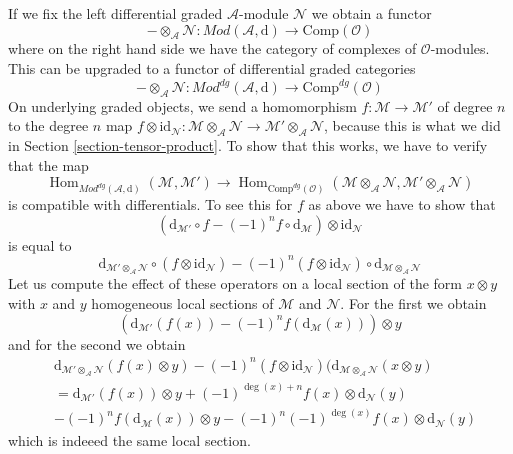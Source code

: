 \documentclass{stacks-project}
\theoremstyle{plain}
\theoremstyle{definition}
\theoremstyle{remark}
\numberwithin{equation}{subsection}
\def\Hom{\mathop{\mathrm{Hom}}\nolimits}
\begin{document}
\medskip\noindent
If we fix the left differential graded $\mathcal{A}$-module $\mathcal{N}$
we obtain a functor
$$
- \otimes_\mathcal{A} \mathcal{N} :
\textit{Mod}(\mathcal{A}, \text{d})
\longrightarrow
\text{Comp}(\mathcal{O})
$$
where on the right hand side we have the category of complexes of
$\mathcal{O}$-modules. This can be upgraded to a functor of
differential graded categories
$$
- \otimes_\mathcal{A} \mathcal{N} :
\textit{Mod}^{dg}(\mathcal{A}, \text{d})
\longrightarrow
\text{Comp}^{dg}(\mathcal{O})
$$
On underlying graded objects, we send
a homomorphism $f : \mathcal{M} \to \mathcal{M}'$ of degree $n$ 
to the degree $n$ map
$f \otimes \text{id}_\mathcal{N} :
\mathcal{M} \otimes_\mathcal{A} \mathcal{N} \to
\mathcal{M}' \otimes_\mathcal{A} \mathcal{N}$, because
this is what we did in Section \ref{section-tensor-product}.
To show that this works, we have to verify that the map
$$
\Hom_{\textit{Mod}^{dg}(\mathcal{A}, \text{d})}(\mathcal{M}, \mathcal{M}')
\longrightarrow
\Hom_{\text{Comp}^{dg}(\mathcal{O})}(
\mathcal{M} \otimes_\mathcal{A} \mathcal{N},
\mathcal{M}' \otimes_\mathcal{A} \mathcal{N})
$$
is compatible with differentials. To see this for $f$ as above
we have to show that
$$
(\text{d}_{\mathcal{M}'} \circ f - (-1)^n f \circ \text{d}_\mathcal{M})
\otimes \text{id}_\mathcal{N}
$$
is equal to
$$
\text{d}_{\mathcal{M}' \otimes_\mathcal{A} \mathcal{N}}
\circ (f \otimes \text{id}_\mathcal{N})
- (-1)^n (f \otimes \text{id}_\mathcal{N}) \circ
\text{d}_{\mathcal{M} \otimes_\mathcal{A} \mathcal{N}}
$$
Let us compute the effect of these operators on a local section
of the form $x \otimes y$ with $x$ and $y$ homogeneous local sections
of $\mathcal{M}$ and $\mathcal{N}$. For the first we obtain
$$
(\text{d}_{\mathcal{M}'}(f(x)) - (-1)^n f(\text{d}_\mathcal{M}(x))) \otimes y
$$
and for the second we obtain
\begin{align*}
&\text{d}_{\mathcal{M}' \otimes_\mathcal{A} \mathcal{N}}(f(x) \otimes y)
- (-1)^n (f \otimes \text{id}_\mathcal{N})(
\text{d}_{\mathcal{M} \otimes_\mathcal{A} \mathcal{N}}(x \otimes y) \\
& =
\text{d}_{\mathcal{M}'}(f(x)) \otimes y +
(-1)^{\deg(x) + n}f(x) \otimes \text{d}_\mathcal{N}(y) \\
&
-(-1)^n f(\text{d}_\mathcal{M}(x)) \otimes y
-(-1)^n (-1)^{\deg(x)}f(x) \otimes \text{d}_\mathcal{N}(y)
\end{align*}
which is indeeed the same local section.
\end{document}
